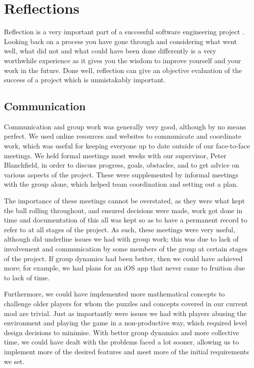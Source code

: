\chapter{Reflections}
\label{ch:reflections}
Reflection is a very important part of a successful software engineering project
\cite{dowling00}. Looking back on a process you
have gone through and considering what went well, what did not and what could have been
done differently is a very worthwhile experience as it gives you the wisdom to improve
yourself and your work in the future. Done well, reflection can give an objective evaluation
of the success of a project which is unmistakably important.

\section{Communication}
Communication and group work was generally very good, although by no means perfect. We
used online resources and websites to communicate and coordinate work, which was useful
for keeping everyone up to date outside of our face-to-face meetings. We held formal
meetings most weeks with our supervisor, Peter Blanchfield, in order to discuss progress,
goals, obstacles, and to get advice on various aspects of the project. These were
supplemented by informal meetings with the group alone, which helped team coordination
and setting out a plan.

The importance of these meetings cannot be overstated, as they
were what kept the ball rolling throughout, and ensured decisions were made, work got done
in time and documentation of this all was kept so as to have a permanent record to refer to
at all stages of the project. As such, these meetings were very useful, although did underline
issues we had with group work; this was due to lack of involvement and communication by some
members of the group at certain stages of the project. If group dynamics had been better,
then we could have achieved more; for example, we had plans for an iOS app that never came
to fruition due to lack of time.

Furthermore, we could have implemented more mathematical
concepts to challenge older players for whom the puzzles and concepts covered in our
current mod are trivial. Just as importantly were issues we had with players abusing the
environment and playing the game in a non-productive way, which required level design decisions
to minimise. With better group dynamics and more collective time, we could have dealt with
the problems faced a lot sooner, allowing us to implement more of the desired features and
meet more of the initial requirements we set.

